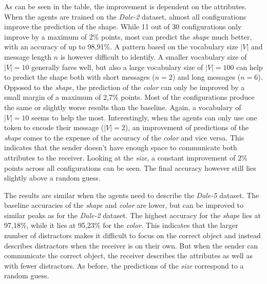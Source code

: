 As can be seen in the table, the improvement is dependent on the attributes.
When the agents are trained on the \emph{Dale-2} dataset, almost all configurations improve the prediction of the shape.
While 11 out of 30 configurations only improve by a maximum of 2\% points, most can predict the \emph{shape} much better, with an accuracy of up to 98,91\%.
A pattern based on the vocabulary size $|V|$ and message length $n$ is however difficult to identify.
A smaller vocabulary size of $|V|=10$ generally fares well, but also a large vocabulary size of $|V|=100$ can help to predict the shape both with short messages ($n=2$) and long messages ($n=6$).
Opposed to the \emph{shape}, the prediction of the \emph{color} can only be improved by a small margin of a maximum of 2,7\% points.
Most of the configurations produce the same or slightly worse results than the baseline.
Again, a vocabulary of $|V|=10$ seems to help the most.
Interestingly, when the agents can only use one token to encode their message ($|V|=2$), an improvement of predictions of the \emph{shape} comes to the expense of the accuracy of the \emph{color} and vice versa.
This indicates that the sender doesn't have enough space to communicate both attributes to the receiver.
Looking at the \emph{size}, a constant improvement of 2\% points across all configurations can be seen.
The final accuracy however still lies slightly above a random guess.

The results are similar when the agents need to describe the \emph{Dale-5} dataset.
The baseline accuracies of the \emph{shape} and \emph{color} are lower, but can be improved to similar peaks as for the \emph{Dale-2} dataset.
The highest accuracy for the \emph{shape} lies at 97,18\%, while it lies at 95,23\% for the \emph{color}.
This indicates that the larger number of distractors makes it difficult to focus on the correct object and instead describes distractors when the receiver is on their own.
But when the sender can communicate the correct object, the receiver describes the attributes as well as with fewer distractors.
As before, the predictions of the \emph{size} correspond to a random guess.

